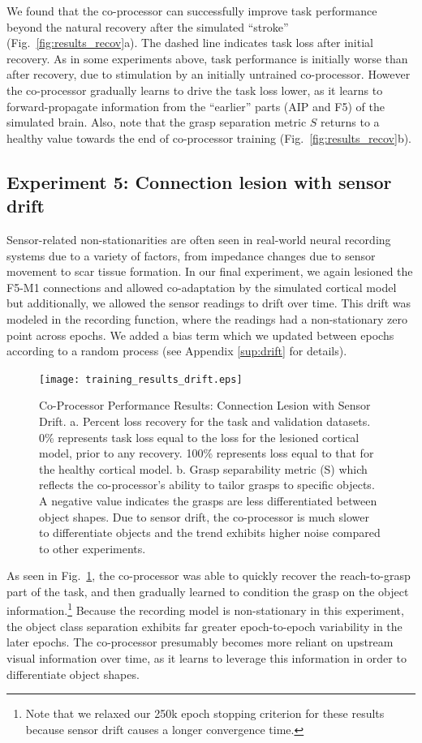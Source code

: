 \documentclass[12pt]{iopart}
\begin{document}
We found that the co-processor can successfully improve task performance beyond the natural
recovery after the simulated ``stroke'' (Fig.~\ref{fig:results_recov}a). The dashed line
indicates task loss after initial recovery. As in some experiments above, task performance is
initially worse than after recovery, due to stimulation by an  initially untrained co-processor. However
the co-processor gradually learns to drive the task loss lower, as it learns to forward-propagate information
from the ``earlier'' parts (AIP and F5) of the simulated brain. Also, note that the grasp separation metric $S$
returns to a healthy value towards the end of co-processor training
(Fig.~\ref{fig:results_recov}b).

\subsection{Experiment 5: Connection lesion with sensor drift}
Sensor-related non-stationarities are
often seen in real-world neural recording systems due to a variety of factors, from impedance
changes due to sensor movement to scar tissue formation. In our final experiment, we again lesioned the F5-M1
connections and allowed co-adaptation by the simulated cortical model but additionally, we allowed the sensor
readings to drift over time. This drift was modeled in the recording function, where the readings had a non-stationary
zero point across epochs. We added a bias term which we updated between epochs according to a random process
(see Appendix \ref{sup:drift} for details).

\begin{figure}[h]
\centering
\texttt{[image: training\_results\_drift.eps]}
\caption{Co-Processor Performance Results: Connection Lesion with Sensor Drift. a.
         Percent loss recovery for the task and validation datasets. 0\% represents task loss equal to the loss for
         the lesioned cortical model, prior to any recovery. 100\% represents
         loss equal to that for the healthy cortical model.
         b. Grasp separability metric (S) which reflects the co-processor's ability
         to tailor grasps to specific objects. A negative value indicates the grasps are less
         differentiated between object shapes. Due to sensor drift, the co-processor
         is much slower to differentiate objects and the trend exhibits
         higher noise compared to other experiments.}
\label{fig:results_drift}
\end{figure}

As seen in Fig.~\ref{fig:results_drift}, the co-processor was able to quickly
recover the reach-to-grasp part of the task, and then gradually learned to
condition the grasp on the object information.\footnote{Note that we relaxed our 250k epoch
         stopping criterion for these results because sensor drift causes a longer
         convergence time.} Because the recording model is non-stationary
in this experiment, the object class separation exhibits far greater epoch-to-epoch
variability in the later epochs. The co-processor presumably becomes more
reliant on upstream visual information over time, as it learns to leverage this information 
in order to differentiate object shapes.
\end{document}
